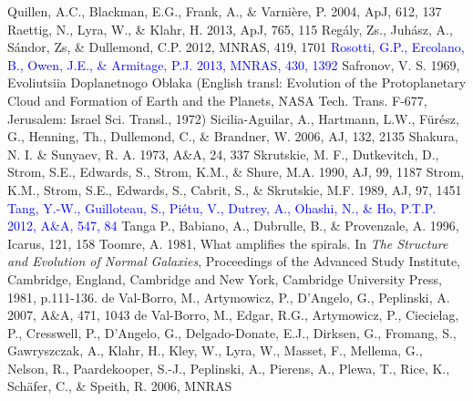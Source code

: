 \documentclass[apj]{emulateapj}
\def\blue#1{\textcolor{blue}{#1}}
\begin{document}
\begin{thebibliography}{}
 Quillen, A.C., Blackman, E.G., Frank, A., \& Varni\`ere, P. 2004, ApJ, 612, 137
 Raettig, N., Lyra, W., \& Klahr, H. 2013, ApJ, 765, 115
 Reg\'aly, Zs., Juh\'asz, A., S\'andor, Zs, \& Dullemond, C.P. 2012, MNRAS, 419, 1701
\bibitem[{{\blue{Rosotti et al.}}(2013)}]{Rosotti13} \blue{Rosotti, G.P., Ercolano, B., Owen, J.E., \& Armitage, P.J. 2013, MNRAS, 430, 1392} 
 Safronov, V. S. 1969, Evoliutsiia Doplanetnogo Oblaka (English transl: Evolution of the Protoplanetary Cloud and Formation of Earth and the Planets, NASA Tech. Trans. F-677, Jerusalem: Israel Sci. Transl., 1972)
 Sicilia-Aguilar, A., Hartmann, L.W., F\"ur\'esz, G., Henning, Th., Dullemond, C., \& Brandner, W. 2006, AJ, 132, 2135
 Shakura, N. I. \& Sunyaev, R. A. 1973, A\&A, 24, 337
 Skrutskie, M. F., Dutkevitch, D., Strom, S.E., Edwards, S., Strom, K.M., \& Shure, M.A. 1990, AJ, 99, 1187
 Strom, K.M., Strom, S.E., Edwards, S., Cabrit, S., \& Skrutskie, M.F. 1989, AJ, 97, 1451
\bibitem[{{\blue{Tang et al.}}(2012)}]{Tang12} \blue{Tang, Y.-W., Guilloteau, S., Pi\'etu, V., Dutrey, A., Ohashi, N., \& Ho, P.T.P. 2012, A\&A, 547, 84}
 Tanga P., Babiano, A., Dubrulle, B., \& Provenzale, A. 1996, Icarus, 121, 158
 Toomre, A. 1981, What amplifies the spirals. In {\it The Structure and Evolution of Normal Galaxies}, Proceedings of the Advanced Study Institute, Cambridge, England, Cambridge and New York, Cambridge University Press, 1981, p.111-136.
de Val-Borro, M., Artymowicz, P., D'Angelo, G., Peplinski, A. 2007, A\&A, 471, 1043
de Val-Borro, M., Edgar, R.G., Artymowicz, P., Ciecielag, P., Cresswell, P., D'Angelo, G., Delgado-Donate, E.J., Dirksen, G., Fromang, S., Gawryszczak, A., Klahr, H., Kley, W., Lyra, W., Masset, F., Mellema, G., Nelson, R., Paardekooper, S.-J., Peplinski, A., Pierens, A., Plewa, T., Rice, K., Sch\"afer, C., \& Speith, R. 2006, MNRAS

\end{thebibliography}
\end{document}
